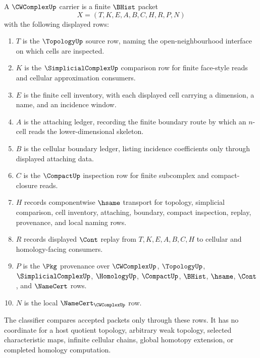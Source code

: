 \begin{definition}\label{def:cw-complex-carrier}
A $\CWComplexUp$ carrier is a finite $\BHist$ packet
$$
X=(T,K,E,A,B,C,H,R,P,N)
$$
with the following displayed rows:
\begin{enumerate}
\item $T$ is the $\TopologyUp$ source row, naming the open-neighbourhood interface on which cells are inspected.
\item $K$ is the $\SimplicialComplexUp$ comparison row for finite face-style reads and cellular approximation consumers.
\item $E$ is the finite cell inventory, with each displayed cell carrying a dimension, a name, and an incidence window.
\item $A$ is the attaching ledger, recording the finite boundary route by which an $n$-cell reads the lower-dimensional skeleton.
\item $B$ is the cellular boundary ledger, listing incidence coefficients only through displayed attaching data.
\item $C$ is the $\CompactUp$ inspection row for finite subcomplex and compact-closure reads.
\item $H$ records componentwise $\hsame$ transport for topology, simplicial comparison, cell inventory, attaching, boundary, compact inspection, replay, provenance, and local naming rows.
\item $R$ records displayed $\Cont$ replay from $T,K,E,A,B,C,H$ to cellular and homology-facing consumers.
\item $P$ is the $\Pkg$ provenance over $\CWComplexUp$, $\TopologyUp$, $\SimplicialComplexUp$, $\HomologyUp$, $\CompactUp$, $\BHist$, $\hsame$, $\Cont$, and $\NameCert$ rows.
\item $N$ is the local $\NameCert_{\CWComplexUp}$ row.
\end{enumerate}
The classifier compares accepted packets only through these rows. It has no coordinate for a host quotient topology, arbitrary weak topology, selected characteristic maps, infinite cellular chains, global homotopy extension, or completed homology computation.
\end{definition}

